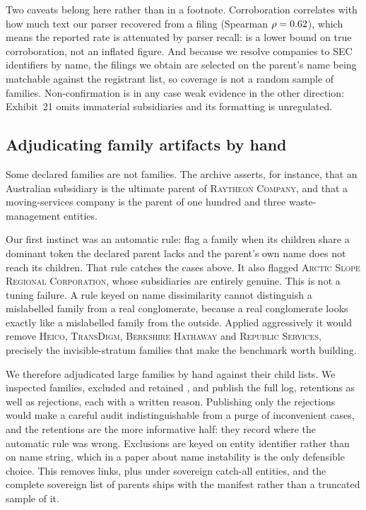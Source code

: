 Two caveats belong here rather than in a footnote. Corroboration correlates with how much
text our parser recovered from a filing (Spearman $\rho=0.62$), which means the
reported rate is attenuated by parser recall: \EdgarInvisibleConfirmPct is a lower bound
on true corroboration, not an inflated figure. And because we resolve companies to SEC
identifiers by name, the filings we obtain are selected on the parent's name being
matchable against the registrant list, so coverage is not a random sample of families.
Non-confirmation is in any case weak evidence in the other direction: Exhibit~21 omits
immaterial subsidiaries and its formatting is unregulated.

\subsection{Adjudicating family artifacts by hand}

Some declared families are not families. The archive asserts, for instance, that an
Australian subsidiary is the ultimate parent of \textsc{Raytheon Company}, and that a
moving-services company is the parent of one hundred and three waste-management entities.

Our first instinct was an automatic rule: flag a family when its children share a dominant
token the declared parent lacks and the parent's own name does not reach its children.
That rule catches the cases above. It also flagged \textsc{Arctic Slope Regional
Corporation}, whose subsidiaries are entirely genuine. This is not a tuning failure. A
rule keyed on name dissimilarity cannot distinguish a mislabelled family from a real
conglomerate, because a real conglomerate looks exactly like a mislabelled family from the
outside. Applied aggressively it would remove \textsc{Heico}, \textsc{TransDigm},
\textsc{Berkshire Hathaway} and \textsc{Republic Services}, precisely the
invisible-stratum families that make the benchmark worth building.

We therefore adjudicated large families by hand against their child lists. We inspected
\BenchInspected families, excluded \BenchExcludedParents and retained \BenchRetained,
and publish the full log, retentions as well as rejections, each with a written
reason. Publishing only the rejections would make a careful audit indistinguishable from
a purge of inconvenient cases, and the retentions are the more informative half: they
record where the automatic rule was wrong. Exclusions are keyed on entity identifier
rather than on name string, which in a paper about name instability is the only
defensible choice. This removes \BenchDroppedArtifact links, plus \BenchDroppedSovereign
under sovereign catch-all entities, and the complete sovereign list of
\BenchSovereignAll parents ships with the manifest rather than a truncated sample of it.

